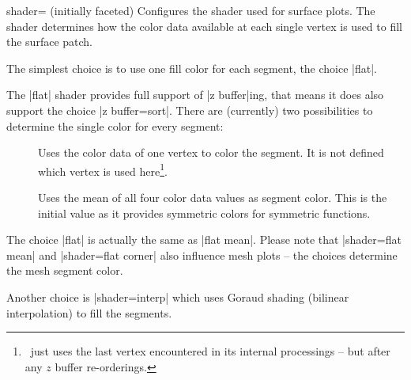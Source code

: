 \begin{pgfplotskey}{shader= (initially faceted)}
	Configures the shader used for surface plots. The shader determines how the color data available at each single vertex is used to fill the surface patch.

	The simplest choice is to use one fill color for each segment, the choice |flat|.

\pgfplotsexpensiveexample
\begin{codeexample}[]
\end{codeexample}

	\noindent The |flat| shader provides full support of |z buffer|ing, that means it does also support the choice |z buffer=sort|. There are (currently) two possibilities to determine the single color for every segment:
	\begin{description}
		\item[] Uses the color data of one vertex to color the segment. It is not defined which vertex is used here\footnote{\PGFPlots\ just uses the last vertex encountered in its internal processings -- but after any $z$ buffer re-orderings.}.

		\item[] Uses the mean of all four color data values as segment color. This is the initial value as it provides symmetric colors for symmetric functions.
	\end{description}
	The choice |flat| is actually the same as |flat mean|. Please note that |shader=flat mean| and |shader=flat corner| also influence mesh plots -- the choices determine the mesh segment color.

	Another choice is |shader=interp| which uses Goraud shading (bilinear interpolation) to fill the segments. 

\pgfplotsexpensiveexample
\begin{codeexample}[]
\end{codeexample}


\end{pgfplotskey}
